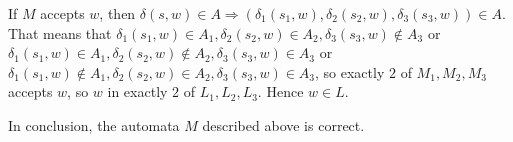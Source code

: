 \documentclass[11pt]{article}
\begin{document}
\begin{solution}
\begin{enumerate}
			If $M$ accepts $w$, then $\delta(s, w) \in A \Rightarrow (\delta_1(s_1, w), \delta_2(s_2, w), \delta_3(s_3, w)) \in A$. That means that $\delta_1(s_1, w) \in A_1, \delta_2(s_2, w) \in A_2, \delta_3(s_3, w) \notin A_3$ or $\delta_1(s_1, w) \in A_1, \delta_2(s_2, w) \notin A_2, \delta_3(s_3, w) \in A_3$ or $\delta_1(s_1, w) \notin A_1, \delta_2(s_2, w) \in A_2, \delta_3(s_3, w) \in A_3$, so exactly $2$ of $M_1, M_2 , M_3$ accepts $w$, so $w$ in exactly $2$ of $L_1, L_2, L_3$. Hence $w \in L$.
				
			In conclusion, the automata $M$ described above is correct.
	\end{enumerate}
\end{solution}
\end{document}
